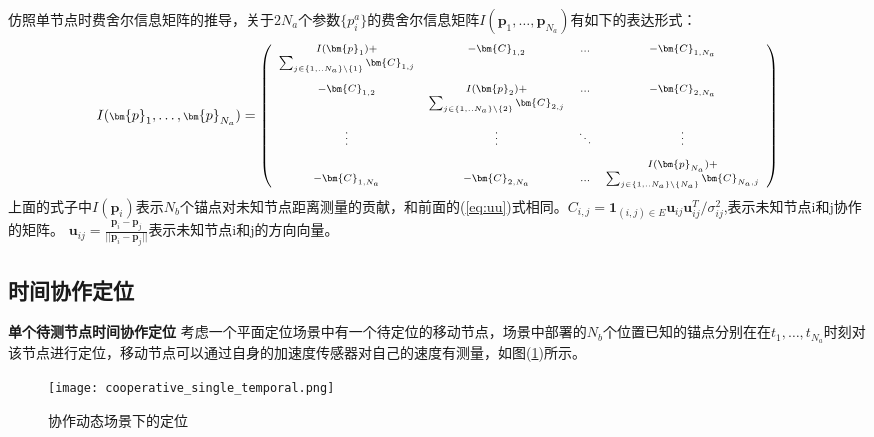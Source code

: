 仿照单节点时费舍尔信息矩阵的推导，关于$2N_a$个参数$\{p_i^a\}$的费舍尔信息矩阵$I(\bm{p}_1,\dots,\bm{p}_{N_a})$有如下的表达形式：
\begin{equation}
\scriptsize{
I(\bm{p}_1,\dots,\bm{p}_{N_a})=
\left(
\begin{array}{cccc}
I(\bm{p}_1)+&-\bm{C}_{1,2}&...&-\bm{C}_{1,N_a}\\
\sum_{j\in \{1,..N_a\}\backslash\{1\}}\bm{C}_{1,j}&&&\\
&&&\\
-\bm{C}_{1,2} & I(\bm{p}_2)+
&...&-\bm{C}_{2,N_a}\\
&\sum_{j\in \{1,..N_a\}\backslash \{2\}}\bm{C}_{2,j}&&\\
&&&\\
\vdots &\vdots&\ddots &\vdots\\
&&&\\
&&&I(\bm{p}_{N_a})+\\
-\bm{C}_{1,N_a}&-\bm{C}_{2,N_a}&...& \sum_{j\in \{1,..N_a\}\backslash\{N_a\}}\bm{C}_{N_a,j}\\
\end{array}
\right)
}
\end{equation}
上面的式子中$I(\bm{p}_i)$表示$N_b$个锚点对未知节点距离测量的贡献，和前面的(\ref{eq:uu})式相同。$C_{i,j}=\bm{1}_{(i,j)\in E}\bm{u}_{ij}\bm{u}_{ij}^T/\sigma^2_{ij}$,表示未知节点i和j协作的矩阵。
$\bm{u}_{ij}=\frac{\bm{p}_i-\bm{p}_j}{||\bm{p}_i-\bm{p}_j||}$表示未知节点i和j的方向向量。
\subsection[时间协作定位]{时间协作定位}\label{subsection:temporal_cooperative_localization}

\textbf{单个待测节点时间协作定位}
考虑一个平面定位场景中有一个待定位的移动节点，场景中部署的$N_b$个位置已知的锚点分别在在$t_1,\dots,t_{N_a}$时刻对该节点进行定位，移动节点可以通过自身的加速度传感器对自己的速度有测量，如图(\ref{fig:cooperative_single_temporal})所示。
        \begin{figure}
          \centering
          \texttt{[image: cooperative\_single\_temporal.png]}
          \caption{协作动态场景下的定位}\label{fig:cooperative_single_temporal}
        \end{figure}

